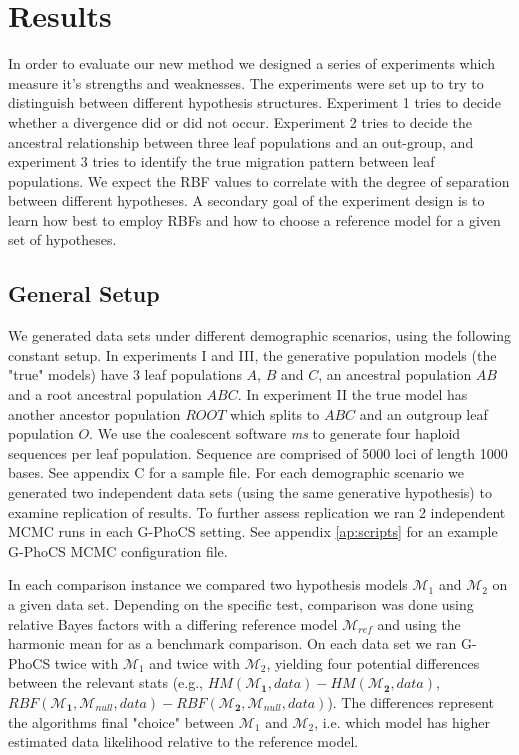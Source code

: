 \documentclass[11pt]{article}
\newcommand{\M}{\mathcal{M}}
\newcommand{\1}{\mathbbm{1}}
\newcommand{\gp}{G-PhoCS }
\begin{document}
\section{Results}

In order to evaluate our new method we designed a series of experiments which measure it's strengths and weaknesses. 
%
The experiments were set up to try to distinguish between different hypothesis structures. 
%
Experiment 1 tries to decide whether a divergence did or did not occur. Experiment 2 tries to decide the ancestral relationship between three leaf populations and an out-group, and experiment 3 tries to identify the true migration pattern between leaf populations. 
%
We expect the RBF values to correlate with the degree of separation between different hypotheses.
%
A secondary goal of the experiment design is to learn how best to employ RBFs and how to choose a reference model for a given set of hypotheses.

\subsection{General Setup}
%
We generated data sets under different demographic scenarios, using the following constant setup. 
%
In experiments I and III, the generative population models (the "true" models) have 3 leaf populations $A$, $B$ and $C$, an ancestral population $AB$ and a root ancestral population $ABC$. 
%
In experiment II the true model has another ancestor population $ROOT$ which splits to $ABC$ and an outgroup leaf population $O$. 
%
We use the coalescent software \textit{ms} to generate four haploid sequences per leaf population. Sequence are comprised of 5000 loci of length 1000 bases. See appendix C for a sample file.
%
For each demographic scenario we generated two independent data sets (using the same generative hypothesis) to examine replication of results. 
%
To further assess replication we ran 2 independent MCMC runs in each G-PhoCS setting. See appendix \ref{ap:scripts} for an example \gp MCMC configuration file.


In each comparison instance we compared two hypothesis models $\M_1$ and $\M_2$ on a given data set. 
%
Depending on the specific test, comparison was done using relative Bayes factors with a differing reference model $\M_{ref}$ and using the harmonic mean for as a benchmark comparison. 
%
On each data set we ran \gp twice with $\M_1$ and twice with $\M_2$, yielding four potential differences between the relevant stats (e.g., $HM(\M_{\mathbf{1}}, data) - HM(\M_{\mathbf{2}},data)$, $RBF(\M_{\mathbf{1}}, \M_{null}, data) - RBF(\M_{\mathbf{2}}, \M_{null}, data)$). 
%
The differences represent the algorithms final "choice" between $\M_1$ and $\M_2$, i.e. which model has higher estimated data likelihood relative to the reference model.
\end{document}
